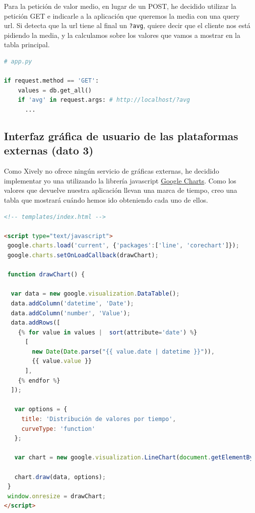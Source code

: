 \documentclass{article}
\begin{document}
Para la petición de valor medio, en lugar de un POST, he decidido utilizar la petición GET e indicarle a la aplicación que queremos la media con una query url. Si detecta que la url tiene al final un \texttt{?avg}, quiere decir que el cliente nos está pidiendo la media, y la calculamos sobre los valores que vamos a mostrar en la tabla principal.

\begin{lstlisting}[language=python]
# app.py

if request.method == 'GET':
    values = db.get_all()
    if 'avg' in request.args: # http://localhost/?avg
      ...

\end{lstlisting}


\subsection{Interfaz gráfica de usuario de las plataformas externas (dato 3)}

Como Xively no ofrece ningún servicio de gráficas externas, he decidido implementar yo una utilizando la librería javascript \href{https://developers.google.com/chart/}{Google Charts}. Como los valores que devuelve nuestra aplicación llevan una marca de tiempo, creo una tabla que mostrará cuándo hemos ido obteniendo cada uno de ellos.

\begin{lstlisting}[language=html]
<!-- templates/index.html -->

<script type="text/javascript">
 google.charts.load('current', {'packages':['line', 'corechart']});
 google.charts.setOnLoadCallback(drawChart);

 function drawChart() {

  var data = new google.visualization.DataTable();
  data.addColumn('datetime', 'Date');
  data.addColumn('number', 'Value');
  data.addRows([
    {% for value in values |  sort(attribute='date') %}
      [
        new Date(Date.parse("{{ value.date | datetime }}")),
        {{ value.value }}
      ],
    {% endfor %}
  ]);

   var options = {
     title: 'Distribución de valores por tiempo',
     curveType: 'function'
   };

   var chart = new google.visualization.LineChart(document.getElementById('chart_div'));

   chart.draw(data, options);
 }
 window.onresize = drawChart;
</script>

\end{lstlisting}
\end{document}
